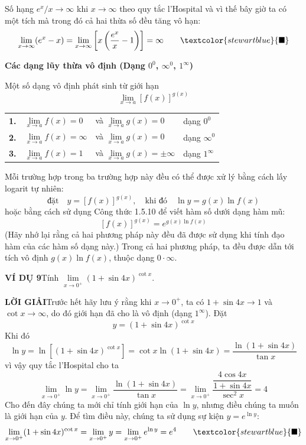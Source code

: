 \begin{minipage}[t]{126mm}
\vspace{0pt}
Số hạng $e^x/x \to \infty$ khi $x \to \infty$ theo quy tắc l’Hospital và vì thế bây giờ ta có một tích mà trong đó cả hai thừa số đều tăng vô hạn:
\[
\lim_{x \to \infty} (e^x - x) = \lim_{x \to \infty} \left[ x \left( \frac{e^x}{x} - 1 \right) \right] = \infty \qquad \textcolor{stewartblue}{\blacksquare}
\]

\vspace{0.8em}
\noindent{\color{stewartblue}\rule{1.1ex}{1.1ex}}\hspace{0.5em}\textbf{\large Các dạng lũy thừa vô định (Dạng $0^0$, $\infty^0$, $1^\infty$)}

Một số dạng vô định phát sinh từ giới hạn
\[
\lim_{x \to a} [f(x)]^{g(x)}
\]
\vspace{-0.5em}
\begin{center}
\renewcommand{\arraystretch}{1.3}
\begin{tabular}{@{}llll@{}}
\textbf{1.} & $\lim\limits_{x \to a} f(x) = 0$ & \quad và \quad $\lim\limits_{x \to a} g(x) = 0$ & \qquad dạng $0^0$ \\
\textbf{2.} & $\lim\limits_{x \to a} f(x) = \infty$ & \quad và \quad $\lim\limits_{x \to a} g(x) = 0$ & \qquad dạng $\infty^0$ \\
\textbf{3.} & $\lim\limits_{x \to a} f(x) = 1$ & \quad và \quad $\lim\limits_{x \to a} g(x) = \pm\infty$ & \qquad dạng $1^\infty$
\end{tabular}
\end{center}

Mỗi trường hợp trong ba trường hợp này đều có thể được xử lý bằng cách lấy logarit tự nhiên:
\[
\text{đặt}\quad y = [f(x)]^{g(x)}, \quad \text{khi đó}\quad \ln y = g(x) \ln f(x)
\]
hoặc bằng cách sử dụng Công thức 1.5.10 để viết hàm số dưới dạng hàm mũ:
\[
[f(x)]^{g(x)} = e^{g(x) \ln f(x)}
\]
(Hãy nhớ lại rằng cả hai phương pháp này đều đã được sử dụng khi tính đạo hàm của các hàm số dạng này.) Trong cả hai phương pháp, ta đều được dẫn tới tích vô định $g(x) \ln f(x)$, thuộc dạng $0 \cdot \infty$.

\vspace{0.6em}
\noindent\textbf{\color{stewartblue}VÍ DỤ 9}\hspace{1em}Tính $\lim\limits_{x \to 0^+} (1 + \sin 4x)^{\cot x}$.

\noindent\textbf{\color{stewartblue}LỜI GIẢI}\hspace{1em}Trước hết hãy lưu ý rằng khi $x \to 0^+$, ta có $1 + \sin 4x \to 1$ và $\cot x \to \infty$, do đó giới hạn đã cho là vô định (dạng $1^\infty$). Đặt
\[
y = (1 + \sin 4x)^{\cot x}
\]
Khi đó
\[
\ln y = \ln [(1 + \sin 4x)^{\cot x}] = \cot x \ln (1 + \sin 4x) = \frac{\ln(1 + \sin 4x)}{\tan x}
\]
vì vậy quy tắc l’Hospital cho ta
\[
\lim_{x \to 0^+} \ln y = \lim_{x \to 0^+} \frac{\ln(1 + \sin 4x)}{\tan x} = \lim_{x \to 0^+} \frac{\dfrac{4\cos 4x}{1 + \sin 4x}}{\sec^2 x} = 4
\]
Cho đến đây chúng ta mới chỉ tính giới hạn của $\ln y$, nhưng điều chúng ta muốn là giới hạn của $y$. Để tìm điều này, chúng ta sử dụng sự kiện $y = e^{\ln y}$:
\[
\lim_{x \to 0^+} (1 + \sin 4x)^{\cot x} = \lim_{x \to 0^+} y = \lim_{x \to 0^+} e^{\ln y} = e^4 \qquad \textcolor{stewartblue}{\blacksquare}
\]


\end{minipage}
